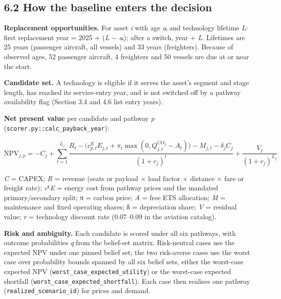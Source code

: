 \documentclass[11pt,a4paper]{article}
\begin{document}
\subsection*{6.2 How the baseline enters the decision}

\textbf{Replacement opportunities.} For asset \emph{i} with age \emph{a}ᵢ and technology lifetime \emph{L}: first replacement year = 2025 + (\emph{L} − \emph{a}ᵢ); after a switch, year + \emph{L}. Lifetimes are 25 years (passenger aircraft, all vessels) and 33 years (freighters). Because of observed ages, 52 passenger aircraft, 4 freighters and 50 vessels are due at or near the start.

\textbf{Candidate set.} A technology is eligible if it serves the asset's segment and stage length, has reached its service-entry year, and is not switched off by a pathway availability flag (Section 3.4 and 4.6 list entry years).

\textbf{Net present value} per candidate and pathway \emph{p} (\texttt{scorer.\allowbreak{}py::calc\_\allowbreak{}payback\_\allowbreak{}year}):

\[
\mathrm{NPV}_{j,p} = -C_j + \sum_{t=1}^{L_j} \frac{R_{t} - \big(c^{E}_{p,t} E_{j,t} + \pi_{t} \max(0, Q^{CO_2}_{j,t} - A_{t})\big) - M_{j,t} - \delta_j C_j}{(1+r_j)^t} + \frac{V_j}{(1+r_j)^{L_j}}
\]

\emph{C} = CAPEX; \emph{R} = revenue (seats or payload × load factor × distance × fare or freight rate); \emph{c}ᴱ\emph{E} = energy cost from pathway prices and the mandated primary/secondary split; π = carbon price; \emph{A} = free ETS allocation; \emph{M} = maintenance and fixed operating shares; δ = depreciation share; \emph{V} = residual value; \emph{r} = technology discount rate (0.07–0.09 in the aviation catalog).

\textbf{Risk and ambiguity.} Each candidate is scored under all six pathways, with outcome probabilities \emph{q} from the belief-set matrix. Risk-neutral cases use the expected NPV under one pinned belief set; the two risk-averse cases use the worst case over probability bounds spanned by all six belief sets, either the worst-case expected NPV (\texttt{worst\_\allowbreak{}case\_\allowbreak{}expected\_\allowbreak{}utility}) or the worst-case expected shortfall (\texttt{worst\_\allowbreak{}case\_\allowbreak{}expected\_\allowbreak{}shortfall}). Each case then realises one pathway (\texttt{realized\_\allowbreak{}scenario\_\allowbreak{}id}) for prices and demand.
\end{document}
